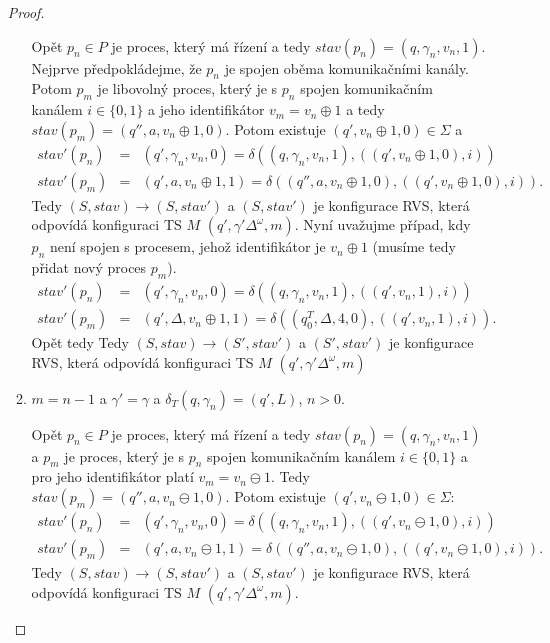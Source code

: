 \documentclass[a4paper,12pt]{article}
\begin{document}
\begin{enumerate}[label=\textbf{\arabic*}.]
\begin{proof}
\begin{enumerate}
  Opět $p_n\in P$ je proces, který má řízení a tedy $stav(p_n) = (q, \gamma_n, v_n, 1)$.
  Nejprve předpokládejme, že $p_n$ je spojen oběma komunikačními kanály. Potom $p_m$ je libovolný proces, který je s $p_n$ spojen komunikačním kanálem $i\in\{0,1\}$ a jeho identifikátor
  $v_m = v_n \oplus 1$ a tedy $stav(p_m) = (q'', a, v_n\oplus1, 0)$. Potom existuje $(q', v_n\oplus1, 0) \in\Sigma$ a 
   \begin{eqnarray*}
      stav'(p_n) &=& (q',\gamma_n, v_n, 0) = \delta((q, \gamma_n, v_n, 1), ((q', v_n \oplus 1, 0),i))\\
      stav'(p_m) &=& (q', a, v_n\oplus1, 1) = \delta((q'', a, v_n \oplus 1, 0),((q', v_n\oplus1, 0),i)).
   \end{eqnarray*}
   Tedy $(S, stav) \rightarrow (S, stav')$ a $(S, stav')$ je konfigurace RVS, která odpovídá konfiguraci TS $M$ $(q', \gamma'\Delta^{\omega}, m)$.
  Nyní uvažujme případ, kdy $p_n$ není spojen s procesem, jehož identifikátor je $v_n \oplus 1$ (musíme tedy přidat nový proces $p_m$).
  \begin{eqnarray*}
      stav'(p_n) &=& (q',\gamma_n, v_n, 0) = \delta((q, \gamma_n, v_n, 1), ((q', v_n, 1),i))\\
      stav'(p_m) &=& (q', \Delta, v_n\oplus 1, 1) = \delta((q^T_0, \Delta, 4, 0),((q', v_n, 1),i)).
   \end{eqnarray*}
   Opět tedy Tedy $(S, stav) \rightarrow (S', stav')$ a $(S', stav')$ je konfigurace RVS, která odpovídá konfiguraci TS $M$ $(q', \gamma'\Delta^{\omega}, m)$
   
   \item $m = n - 1$ a $\gamma' = \gamma$ a $\delta_T(q, \gamma_n) = (q', L)$, $n > 0$.
  
  Opět $p_n\in P$ je proces, který má řízení a tedy $stav(p_n) = (q, \gamma_n, v_n, 1)$ a
  $p_m$ je proces, který je s $p_n$ spojen komunikačním kanálem $i\in\{0,1\}$ a pro jeho identifikátor platí
  $v_m = v_n \ominus 1$. Tedy $stav(p_m) = (q'', a, v_n\ominus1, 0)$. Potom existuje $(q', v_n\ominus1, 0)\in\Sigma$: 
   \begin{eqnarray*}
      stav'(p_n) &=& (q',\gamma_n, v_n, 0) = \delta((q, \gamma_n, v_n, 1), ((q', v_n \ominus 1, 0),i))\\
      stav'(p_m) &=& (q', a, v_n\ominus1, 1) = \delta((q'', a, v_n \ominus 1, 0),((q', v_n\ominus1, 0),i)).
   \end{eqnarray*}
   Tedy $(S, stav) \rightarrow (S, stav')$ a $(S, stav')$ je konfigurace RVS, která odpovídá konfiguraci TS $M$ $(q', \gamma'\Delta^{\omega}, m)$.
 \end{enumerate}
 

\end{proof}
\end{enumerate}
\end{document}
